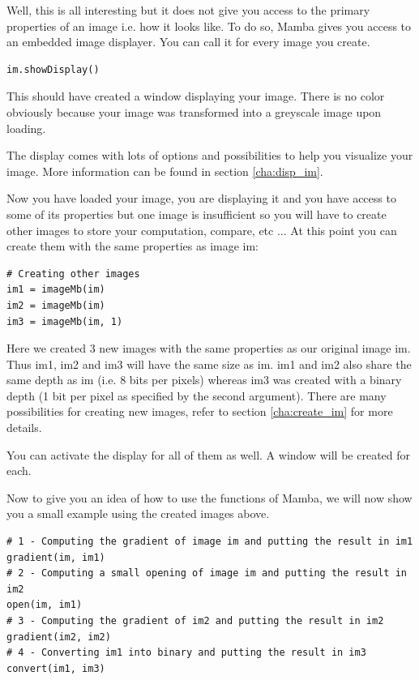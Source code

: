 \documentclass[a4paper,10pt,oneside]{article}
\begin{document}
Well, this is all interesting but it does not give you access to the primary
properties of an image i.e. how it looks like. To do so, Mamba gives you access to
an embedded image displayer. You can call it for every image you create.

\lstset{language=Python}
\begin{lstlisting}
im.showDisplay()
\end{lstlisting}

This should have created a window displaying your image. There is no color
obviously because your image was transformed into a greyscale image upon loading.

The display comes with lots of options and possibilities to help you visualize
your image. More information can be found in section \ref{cha:disp_im}.

Now you have loaded your image, you are displaying it and you have access to 
some of its properties but one image is insufficient so you will have to create
other images to store your computation, compare, etc ... At this point you can
create them with the same properties as image im:

\lstset{language=Python}
\begin{lstlisting}
# Creating other images
im1 = imageMb(im)
im2 = imageMb(im)
im3 = imageMb(im, 1)
\end{lstlisting}

Here we created 3 new images with the same properties as our original image im.
Thus im1, im2 and im3 will have the same size as im. im1 and im2 also share 
the same depth as im (i.e. 8 bits per pixels) whereas im3 was created with a 
binary depth (1 bit per pixel as specified by the second argument). There are many
possibilities for creating new images, refer to section \ref{cha:create_im} for
more details.

You can activate the display for all of them as well. A window will be created
for each.

Now to give you an idea of how to use the functions of Mamba, we will now show
you a small example using the created images above.

\lstset{language=Python}
\begin{lstlisting}
# 1 - Computing the gradient of image im and putting the result in im1
gradient(im, im1)
# 2 - Computing a small opening of image im and putting the result in im2
open(im, im1)
# 3 - Computing the gradient of im2 and putting the result in im2
gradient(im2, im2)
# 4 - Converting im1 into binary and putting the result in im3
convert(im1, im3)
\end{lstlisting}
\end{document}
